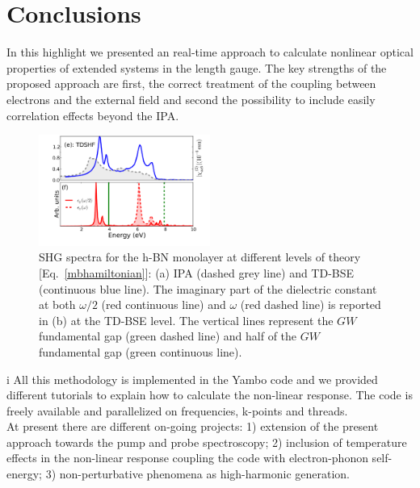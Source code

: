 \section{Conclusions}\label{conclusion}                                        
In this highlight we presented an \ai real-time approach to calculate nonlinear optical properties of extended systems in the length gauge. The key strengths of the proposed approach are first, the correct treatment of the coupling between electrons and the external field and second the possibility to include easily correlation effects beyond the IPA.  
\begin{figure}[H]
    \centering
\includegraphics[width=0.5\textwidth]{Figures/eps_and_X2_short}
	\caption{\footnotesize{SHG spectra for the h-BN monolayer at different levels of theory [Eq.~\eqref{mbhamiltonian}]: (a) IPA (dashed grey line) and TD-BSE (continuous blue line). The imaginary part of the dielectric constant at both $\omega/2$ (red continuous line) and $\omega$ (red dashed line) is reported in (b) at the  TD-BSE level. The vertical lines represent the $GW$ fundamental gap (green dashed line) and half of the $GW$ fundamental gap (green continuous line). \label{X2bn} }}
\end{figure}
i%
All this methodology is implemented in the Yambo code\cite{yambo} and we provided different tutorials to explain how to calculate the non-linear response.\cite{yambo_wiki} The code is freely available and parallelized on frequencies, k-points and threads. \\
At present there are different on-going projects: 1) extension of the present approach towards the pump and probe spectroscopy; 2) inclusion of temperature effects in the non-linear response coupling the code with electron-phonon self-energy; 3) non-perturbative phenomena as high-harmonic generation.

